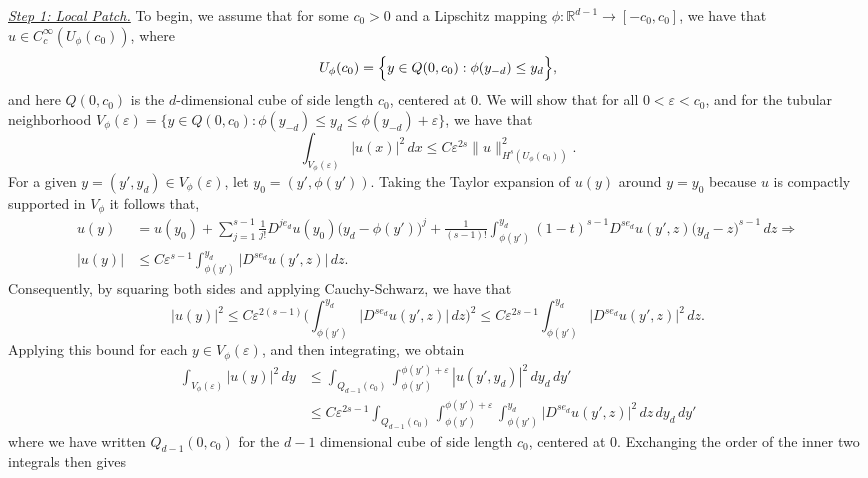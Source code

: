 \documentclass{article}
\newcommand{\Reals}{\mathbb{R}}
\newcommand{\1}{\mathbf{1}}
\theoremstyle{definition}
\theoremstyle{remark}
\begin{document}
\underline{\textit{Step 1: Local Patch.}}
To begin, we assume that for some $c_0 > 0$ and a Lipschitz mapping $\phi: \Reals^{d - 1} \to [-c_0,c_0]$, we have that $u \in C_c^{\infty}(U_{\phi}(c_0))$, where 
\begin{equation*}
U_{\phi}(c_0) = \Bigl\{y \in Q(0,c_0): \phi(y_{-d}) \leq y_d\Bigr\}, 
\end{equation*}
and here $Q(0,c_0)$ is the $d$-dimensional cube of side length $c_0$, centered at $0$. We will show that for all $0 < \varepsilon < c_0$, and for the tubular neighborhood $V_{\phi}(\varepsilon) = \{y \in Q(0,c_0): \phi(y_{-d}) \leq y_d \leq \phi(y_{-d}) + \varepsilon\}$, we have that
\begin{equation*}
\int_{V_{\phi}(\varepsilon)} |u(x)|^2 \,dx \leq C\varepsilon^{2s} \|u\|_{H^s(U_{\phi}(c_0))}^2.
\end{equation*}
For a given $y = (y',y_d) \in V_{\phi}(\varepsilon)$, let $y_0 = (y',\phi(y'))$. Taking the Taylor expansion of $u(y)$ around $y = y_0$ because $u$ is compactly supported in $V_{\phi}$ it follows that,
\begin{align*}
u(y) & = u(y_0) + \sum_{j = 1}^{s - 1} \frac{1}{j!} D^{je_d}u(y_0) \bigl(y_d - \phi(y')\bigr)^j + \frac{1}{(s - 1)!}\int_{\phi(y')}^{y_d} (1 - t)^{s - 1} D^{se_d}u(y',z) \bigl(y_d - z\bigr)^{s - 1} \,dz \Longrightarrow\\
|u(y)| & \leq C\varepsilon^{s - 1}\int_{\phi(y')}^{y_d} \bigl|D^{se_d}u(y',z)\bigr| \,dz. 
\end{align*}
Consequently, by squaring both sides and applying Cauchy-Schwarz, we have that
\begin{equation*}
|u(y)|^2 \leq C\varepsilon^{2(s - 1)} \biggl(\int_{\phi(y')}^{y_d} \bigl|D^{se_d}u(y',z)\bigr| \,dz\biggr)^2 \leq C\varepsilon^{2s - 1} \int_{\phi(y')}^{y_d} \bigl|D^{se_d}u(y',z)\bigr|^2 \,dz.
\end{equation*}
Applying this bound for each $y \in V_{\phi}(\varepsilon)$, and then integrating, we obtain
\begin{align}
\int_{V_{\phi}(\varepsilon)} |u(y)|^2 \,dy & \leq \int_{Q_{d - 1}(c_0)} \int_{\phi(y')}^{\phi(y') + \varepsilon} |u(y',y_d)|^2 \,dy_d \,dy' \nonumber \\
& \leq C\varepsilon^{2s - 1}\int_{Q_{d - 1}(c_0)}  \int_{\phi(y')}^{\phi(y') + \varepsilon} \int_{\phi(y')}^{y_d} \bigl|D^{se_d}u(y',z)\bigr|^2 \,dz \,dy_d \,dy' \label{pf:kernel_smoothing_bias_4}
\end{align}
where we have written $Q_{d - 1}(0,c_0)$ for the $d - 1$ dimensional cube of side length $c_0$, centered at $0$. Exchanging the order of the inner two integrals then gives
\end{document}
